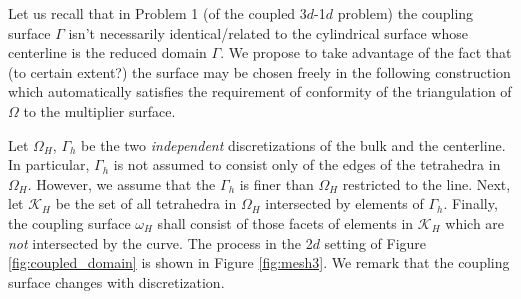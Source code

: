\documentclass[r]{siamart171218}
\begin{document}
Let us recall that in Problem 1 (of the coupled 3$d$-1$d$ problem) the coupling surface $\Gamma$ isn't necessarily
identical/related to the cylindrical surface whose centerline is the reduced
domain $\Gamma$. We propose to take advantage of the fact that (to certain extent?)
the surface may be chosen freely in the following construction which automatically
satisfies the requirement of conformity of the triangulation of $\Omega$ to the
multiplier surface.

Let $\Omega_H$, $\Gamma_h$ be the two \emph{independent} discretizations of the
bulk and the centerline. In particular, $\Gamma_h$ is not assumed to consist only
of the edges of the tetrahedra in $\Omega_H$. However, we assume that the $\Gamma_h$
is finer than $\Omega_H$ restricted to the line. Next, let $\mathcal{K}_H$ be
the set of all tetrahedra in $\Omega_H$ intersected by elements of $\Gamma_h$.
Finally, the coupling surface $\omega_H$ shall consist of those facets
of elements in $\mathcal{K}_H$ which are \emph{not} intersected by the curve.
The process in the 2$d$ setting of Figure \ref{fig:coupled_domain} is shown
in Figure \ref{fig:mesh3}. We remark that the coupling surface changes with
discretization.
\end{document}

